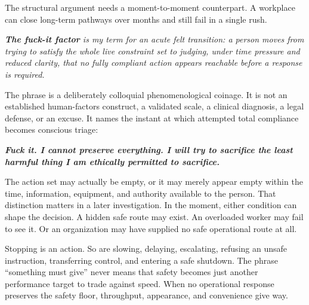 \documentclass[11pt,oneside]{article}
\renewenvironment{quote}
  {\begin{tcolorbox}[
      enhanced,
      breakable,
      colback=ManifestLight,
      colframe=ManifestRule,
      boxrule=0pt,
      leftrule=3pt,
      arc=0pt,
      outer arc=0pt,
      left=10pt,right=10pt,top=8pt,bottom=8pt,
      before skip=0.8em,after skip=0.8em
    ]\itshape}
  {\end{tcolorbox}}
\begin{document}
The structural argument needs a moment-to-moment counterpart. A
workplace can close long-term pathways over months and still fail in a
single rush.

\begin{quote}
\textbf{The fuck-it factor} is my term for an acute felt transition: a
person moves from trying to satisfy the whole live constraint set to
judging, under time pressure and reduced clarity, that no fully
compliant action appears reachable before a response is required.
\end{quote}

The phrase is a deliberately colloquial phenomenological coinage. It is
not an established human-factors construct, a validated scale, a
clinical diagnosis, a legal defense, or an excuse. It names the instant
at which attempted total compliance becomes conscious triage:

\begin{quote}
\textbf{Fuck it. I cannot preserve everything. I will try to sacrifice
the least harmful thing I am ethically permitted to sacrifice.}
\end{quote}

The action set may actually be empty, or it may merely appear empty
within the time, information, equipment, and authority available to the
person. That distinction matters in a later investigation. In the
moment, either condition can shape the decision. A hidden safe route may
exist. An overloaded worker may fail to see it. Or an organization may
have supplied no safe operational route at all.

Stopping is an action. So are slowing, delaying, escalating, refusing an
unsafe instruction, transferring control, and entering a safe shutdown.
The phrase ``something must give'' never means that safety becomes just
another performance target to trade against speed. When no operational
response preserves the safety floor, throughput, appearance, and
convenience give way.
\end{document}
